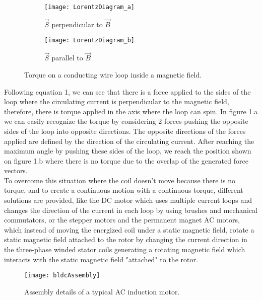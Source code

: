 \begin{figure}[H]
 
\begin{subfigure}{.5\textwidth}
\centering\texttt{[image: LorentzDiagram\_a]} 
\caption{$\overrightarrow{S}$ perpendicular to $\overrightarrow{B}$}
\label{fig:LorentzDiagram_a}
\end{subfigure}
\begin{subfigure}{.5\textwidth}
\centering\texttt{[image: LorentzDiagram\_b]}
\caption{$\overrightarrow{S}$ parallel to $\overrightarrow{B}$}
\label{fig:LorentzDiagram_b}
\end{subfigure}
 
\caption{Torque on a conducting wire loop inside a magnetic field.}
\label{fig:Lorentz_diagrams}
\end{figure}

Following equation 1, we can see that there is a force applied to the sides of the loop where the circulating current is perpendicular to the magnetic field, therefore, there is torque applied in the axis where the loop can spin. In figure 1.a we can easily recognize the torque by considering 2 forces pushing the opposite sides of the loop into opposite directions. The opposite directions of the forces applied are defined by the direction of the circulating current. After reaching the maximum angle by pushing these sides of the loop, we reach the position shown on figure 1.b where there is no torque due to the overlap of the generated force vectors.\\

To overcome this situation where the coil doesn't move because there is no torque, and to create a continuous motion with a continuous torque, different solutions are provided, like the DC motor which uses multiple current loops and changes the direction of the current in each loop by using brushes and mechanical commutators, or the stepper motors and the permanent magnet AC motors, which instead of moving the energized coil under a static magnetic field, rotate a static magnetic field attached to the rotor by changing the current direction in the three-phase winded stator coils generating a rotating magnetic field which interacts with the static magnetic field "attached" to the rotor.

\begin{figure} [H]
\centering\texttt{[image: bldcAssembly]}
\caption{Assembly details of a typical AC induction motor.}
\label{fig:PMAC_assembly}
\end{figure}

